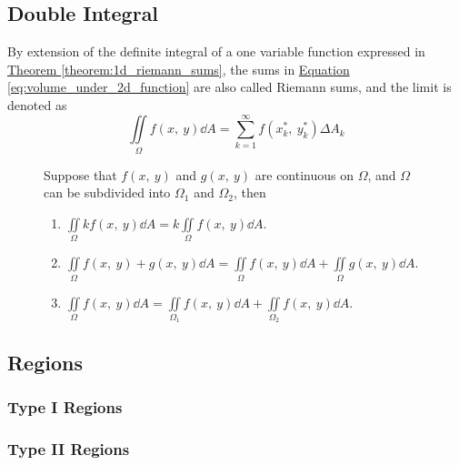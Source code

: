 \documentclass{article}
\begin{document}
\subsection{Double Integral}
\begin{definition}
    By extension of the definite integral of a one variable function expressed in
    \hyperref[theorem:1d_riemann_sums]{Theorem \ref{theorem:1d_riemann_sums}}, the sums in
    \hyperref[eq:volume_under_2d_function]{Equation \ref{eq:volume_under_2d_function}}
    are also called Riemann sums, and the limit is denoted as
    \begin{equation*}
        \iint\limits_{\Omega} f(x,\: y)  \dd{A}
        = \sum_{k=1}^{\infty} f(x_k^\ast,\: y_k^\ast) \Delta A_k
    \end{equation*}
\end{definition}
\begin{figure}[H]
	\begin{mdframed}[style=exampledefault,frametitle={Properties of Double Integrals}]
		\begin{theorem}
            Suppose that $f(x,\: y) $ and $g(x,\: y)$ are continuous on $\Omega$,
            and $\Omega$ can be subdivided into $\Omega_1$ and $\Omega_2$, then
			\begin{enumerate}[label=\normalfont\alph*)]
				\item $\displaystyle\iint\limits_\Omega kf(x,\: y) \dd{A}
                    = k\iint\limits_\Omega f(x,\: y) \dd{A}$.
				\item $\displaystyle\iint\limits_\Omega f(x,\: y) + g(x,\: y) \dd{A}
                    = \iint\limits_\Omega f(x,\: y) \dd{A} + \iint\limits_\Omega g(x,\: y) \dd{A}$.
                \item $\displaystyle\iint\limits_\Omega f(x,\: y) \dd{A}
                    = \iint\limits_{\Omega_1} f(x,\: y) \dd{A} + \iint\limits_{\Omega_2} f(x,\: y) \dd{A}$.
			\end{enumerate}
		\end{theorem}
	\end{mdframed}
\end{figure}
\subsection{Regions}
\subsubsection{Type I Regions}
\subsubsection{Type II Regions}
\end{document}
